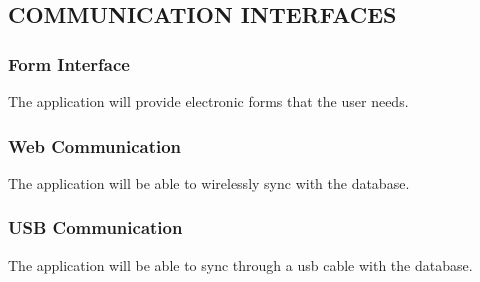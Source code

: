 \documentclass[twoside,letterpaper]{article}
\begin{document}
\subsection[COMMUNICATION INTERFACES]{\rmfamily\bfseries\color{black}
COMMUNICATION INTERFACES}
{\rmfamily\color{black}

\subsubsection{Form Interface}
The application will provide electronic forms that the user needs.

\subsubsection{Web Communication}
The application will be able to wirelessly sync with the database.

\subsubsection{USB Communication}
The application will be able to sync through a usb cable with the database.}
\end{document}
